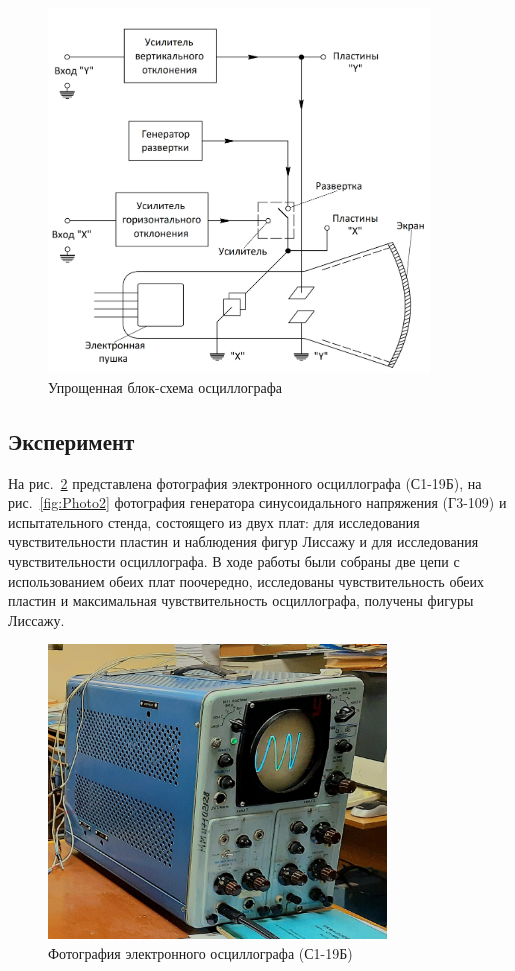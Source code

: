 \begin{figure}[H]
\centering
\includegraphics[width=0.9\textwidth]{Scheme2.png}
\caption{Упрощенная блок-схема осциллографа}
\label{fig:Scheme2}
\end{figure}

\subsection{Эксперимент}
На рис.~\ref{fig:Photo1} представлена фотография электронного осциллографа (С1-19Б), на рис.~\ref{fig:Photo2} фотография генератора синусоидального напряжения (Г3-109) и испытательного стенда, состоящего из двух плат: для исследования чувствительности пластин и наблюдения фигур Лиссажу и для исследования чувствительности осциллографа. В ходе работы были собраны две цепи с использованием обеих плат поочередно, исследованы чувствительность обеих пластин и максимальная чувствительность осциллографа, получены фигуры Лиссажу.

\begin{figure}[H]
\centering
\includegraphics[width=0.8\textwidth]{Photo1.jpg}
\caption{Фотография электронного осциллографа (С1-19Б)}
\label{fig:Photo1}
\end{figure}

